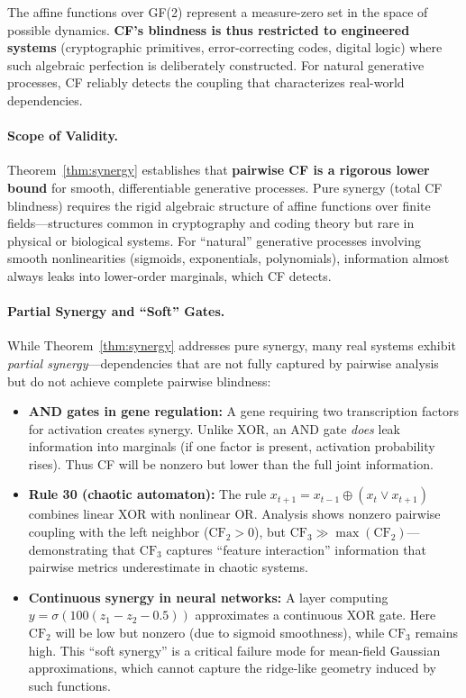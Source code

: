 \documentclass[10pt]{article} %
\theoremstyle{plain}
\theoremstyle{definition}
\begin{document}
\noindent The affine functions over GF(2) represent a measure-zero set in the space of possible dynamics. \textbf{CF's blindness is thus restricted to engineered systems} (cryptographic primitives, error-correcting codes, digital logic) where such algebraic perfection is deliberately constructed. For natural generative processes, CF reliably detects the coupling that characterizes real-world dependencies.

\paragraph{Scope of Validity.} Theorem~\ref{thm:synergy} establishes that \textbf{pairwise CF is a rigorous lower bound} for smooth, differentiable generative processes. Pure synergy (total CF blindness) requires the rigid algebraic structure of affine functions over finite fields---structures common in cryptography and coding theory but rare in physical or biological systems. For ``natural'' generative processes involving smooth nonlinearities (sigmoids, exponentials, polynomials), information almost always leaks into lower-order marginals, which CF detects.

\paragraph{Partial Synergy and ``Soft'' Gates.} While Theorem~\ref{thm:synergy} addresses pure synergy, many real systems exhibit \emph{partial synergy}---dependencies that are not fully captured by pairwise analysis but do not achieve complete pairwise blindness:

\begin{itemize}
    \item \textbf{AND gates in gene regulation:} A gene requiring two transcription factors for activation creates synergy. Unlike XOR, an AND gate \emph{does} leak information into marginals (if one factor is present, activation probability rises). Thus CF will be nonzero but lower than the full joint information.
    
    \item \textbf{Rule 30 (chaotic automaton):} The rule $x_{t+1} = x_{t-1} \oplus (x_t \lor x_{t+1})$ combines linear XOR with nonlinear OR. Analysis shows nonzero pairwise coupling with the left neighbor ($\text{CF}_2 > 0$), but $\text{CF}_3 \gg \max(\text{CF}_2)$---demonstrating that $\text{CF}_3$ captures ``feature interaction'' information that pairwise metrics underestimate in chaotic systems.
    
    \item \textbf{Continuous synergy in neural networks:} A layer computing $y = \sigma(100(z_1 - z_2 - 0.5))$ approximates a continuous XOR gate. Here $\text{CF}_2$ will be low but nonzero (due to sigmoid smoothness), while $\text{CF}_3$ remains high. This ``soft synergy'' is a critical failure mode for mean-field Gaussian approximations, which cannot capture the ridge-like geometry induced by such functions.
\end{itemize}
\end{document}
